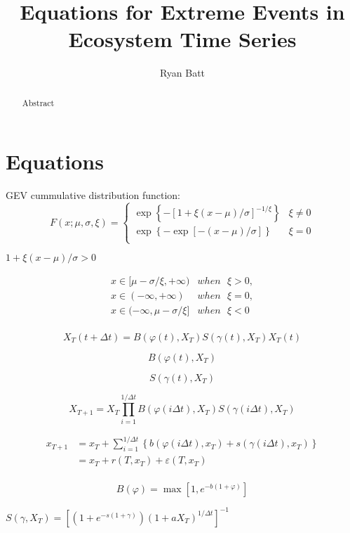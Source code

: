 \documentclass{article}
\title{Equations for Extreme Events in Ecosystem Time Series}
\author{Ryan Batt}
\begin{document}
\maketitle

\begin{abstract}
    Abstract
\end{abstract}

\section{Equations}

GEV cummulative distribution function:  
\[F\left( x;\mu ,\sigma ,\xi  \right)=\left\{ \begin{matrix}
   \exp \left\{ -{{[1+\xi (x-\mu )/\sigma ]}^{-1/\xi }} \right\} & \xi \ne 0  \\
   \exp \left\{ -\exp \left[ -(x-\mu )/\sigma  \right] \right\} & \xi =0  \\
\end{matrix} \right.\]

$1+\xi (x-\mu )/\sigma >0$

\[\begin{array}{*{35}{l}}
   x\in [\mu -\sigma /\xi ,+\infty ) & when\text{ }\xi >0,  \\
   x\in (-\infty ,+\infty ) & when\text{ }\xi =0,  \\
   x\in (-\infty ,\mu -\sigma /\xi ] & when\text{ }\xi <0  \\
\end{array}\]

\[{{X}_{T}}\left( t+\Delta t \right)=B\left( \varphi \left( t \right),{{X}_{T}} \right)S\left( \gamma \left( t \right),{{X}_{T}} \right){{X}_{T}}\left( t \right)\]

\[B\left( \varphi \left( t \right),{{X}_{T}} \right)\]

\[S\left( \gamma \left( t \right),{{X}_{T}} \right)\]

\[{{X}_{T+1}}={{X}_{T}}\prod\limits_{i=1}^{1/\Delta t}{B\left( \varphi \left( i\Delta t \right),{{X}_{T}} \right)S\left( \gamma \left( i\Delta t \right),{{X}_{T}} \right)}\]

\[\begin{array}{*{35}{l}}
   {{x}_{T+1}} & ={{x}_{T}}+\sum\limits_{i=1}^{1/\Delta t}{\left\{ b\left( \varphi \left( i\Delta t \right),{{x}_{T}} \right)+s\left( \gamma \left( i\Delta t \right),{{x}_{T}} \right) \right\}}  \\
   {} & ={{x}_{T}}+r\left( T,{{x}_{T}} \right)+\varepsilon \left( T,{{x}_{T}} \right)  \\
\end{array}\]

\[B\left( \varphi  \right)=\max \left[ 1,{{e}^{-b\left( 1+\varphi  \right)}} \right]\]

$S\left( \gamma ,{{X}_{T}} \right)={{\left[ \left( 1+{{e}^{-s\left( 1+\gamma  \right)}} \right){{\left( 1+a{{X}_{T}} \right)}^{1/\Delta t}} \right]}^{-1}}$
\end{document}
